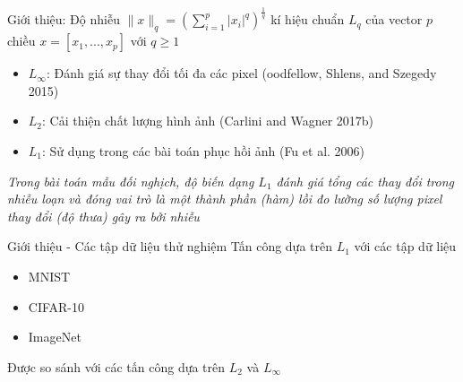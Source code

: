 \begin{frame}{Giới thiệu: Độ nhiễu}
    $\lVert x \rVert_q = \left( \sum_{i=1}^p |x_i|^q \right)^{\frac{1}{q}}$ kí hiệu chuẩn $L_q$
    của vector $p$ chiều $x = [x_1, ..., x_p]$ với $q \geq 1$ 
    
    \begin{itemize}
        \item $L_{\infty}$: Đánh giá sự thay đổi tối đa các pixel (oodfellow, Shlens, and Szegedy 2015)
        \item $L_2$: Cải thiện chất lượng hình ảnh (Carlini and Wagner 2017b)
        \item $L_1$: Sử dụng trong các bài toán phục hồi ảnh (Fu et al. 2006)
    \end{itemize}

    \textit{Trong bài toán mẫu đối nghịch, độ biến dạng $L_1$ đánh giá tổng các thay đổi trong nhiễu loạn và đóng vai trò là một thành phần
    (hàm) lồi đo lường số lượng pixel thay đổi (độ thưa) gây ra bởi nhiễu}
\end{frame}

\begin{frame}{Giới thiệu - Các tập dữ liệu thử nghiệm}
    Tấn công dựa trên $L_1$ với các tập dữ liệu  
    \begin{itemize}
        \item MNIST
        \item CIFAR-10
        \item ImageNet
    \end{itemize}
    Được so sánh với các tấn công dựa trên $L_2$ và $L_{\infty}$
\end{frame}